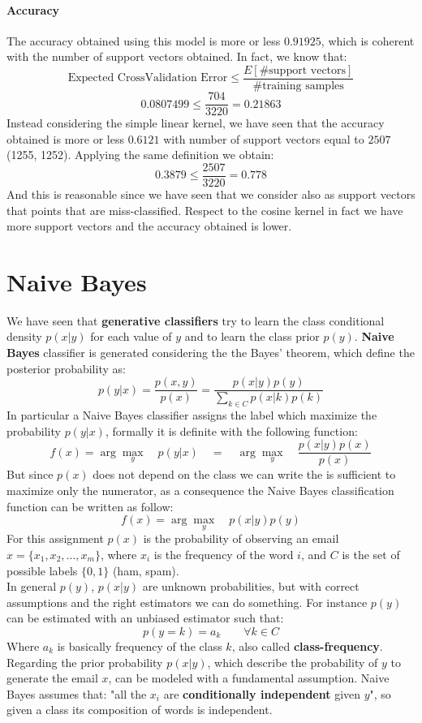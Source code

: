 \documentclass[11pt,a4paper]{article}
\begin{document}
\paragraph{Accuracy} The accuracy obtained using this model is more or less $0.91925$, which is coherent with the number of support vectors obtained. In fact, we know that:
$$\text{Expected CrossValidation Error} \leq \frac{E[\text{\#support vectors}]}{\text{\#training samples}}$$
$$ 0.0807499 \leq \frac{704}{3220} = 0.21863 $$
Instead considering the simple linear kernel, we have seen that the accuracy obtained is more or less $0.6121$ with number of support vectors equal to $2507$ (1255, 1252). Applying the same definition we obtain:
$$0.3879 \leq  \frac{2507}{3220} = 0.778$$
And this is reasonable since we have seen that we consider also as support vectors that points that are miss-classified. Respect to the cosine kernel in fact we have more support vectors and the accuracy obtained is lower. 
\newpage
\section{Naive Bayes}
We have seen that \textbf{generative classifiers} try to learn the class conditional density $p(x|y)$ for each value of $y$ and to learn the class prior $p(y)$. \textbf{Naive Bayes} classifier is generated considering the the Bayes' theorem, which define the posterior probability as:
$$p(y|x) =\frac{p(x,y)}{p(x)} = \frac{p(x|y)p(y)}{\sum_{k \in C}p(x|k)p(k)}$$
In particular a Naive Bayes classifier assigns the label which maximize the probability $p(y|x)$, formally it is definite with the following function:
$$f(x) = \arg \underset{y}{\max}\quad p(y|x) \quad=\quad \arg \underset{y}{\max}\quad \frac{p(x|y)p(x)}{p(x)}$$
But since $p(x)$ does not depend on the class we can write the is sufficient to maximize only the numerator, as a consequence the Naive Bayes classification function can be written as follow:
$$f(x) = \arg \underset{y}{\max}\quad p(x|y)p(y)$$
For this assignment $p(x)$ is the probability of observing an email $x = \{x_1, x_2,\dots,x_m\}$, where $x_i$ is the frequency of the word $i$, and $C$ is the set of possible labels $\{0,1\}$ (ham, spam).\\ 

In general $p(y)$, $p(x|y)$ are unknown probabilities, but with correct assumptions and the right estimators we can do something. For instance $p(y)$ can be estimated with an unbiased estimator such that:
$$p(y = k) = a_k\qquad \forall k \in C$$
Where $a_k$ is basically frequency of the class $k$, also called \textbf{class-frequency}.\\
Regarding the prior probability $p(x|y)$, which describe the probability of $y$ to generate the email $x$, can be modeled with a fundamental assumption. Naive Bayes assumes that: "all the $x_i$ are \textbf{conditionally independent} given $y$", so given a class its composition of words is independent.
\end{document}

